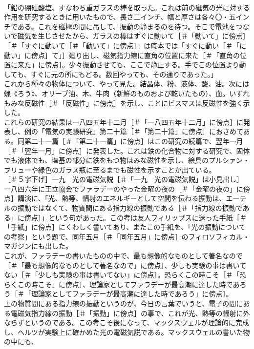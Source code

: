\documentclass[8pt]{extreport}
\begin{document}
\begin{CJK}{UTF8}{min}
\\	「鉛の硼硅酸塩、すなわち重ガラスの棒を取った。これは前の磁気の光に対する作用を研究するときに用いたもので、長さ二インチ、幅と厚さは各々〇・五インチである。これを磁極の間に吊して、振動の静まるのを待つ。そこで電池をつないで磁気を生じさせたから、ガラスの棒はすぐに動いて［＃「動いて」に傍点］［＃「すぐに動いて［＃「動いて」に傍点］」は底本では「すぐに動い［＃「に動い」に傍点］て」］廻り出し、磁気指力線に直角の位置に来た［＃「直角の位置に来た」に傍点］。少々振動させても、ここで静止する。手でこの位置より動しても、すぐに元の所にもどる。数回やっても、その通りであった。」
\\	これから種々の物体について、やって見た。結晶体、粉、液体、酸、油。次には蝋《ろう》、オリーブ油、木、牛肉（新鮮のものおよび乾いたもの）、血。いずれもみな反磁性［＃「反磁性」に傍点］を示し、ことにビスマスは反磁性を強く示した。
\\	これらの研究の結果は一八四五年十二月［＃「一八四五年十二月」に傍点］に発表し、例の「電気の実験研究」第二十篇［＃「第二十篇」に傍点］におさめてある。同第二十一篇［＃「第二十一篇」に傍点］はこの研究の続篇で、翌年一月［＃「翌年一月」に傍点］に発表した。これは鉄の化合物に対する研究で、固体でも液体でも、塩基の部分に鉄をもつ物はみな磁性を示し、絵具のプルシァン・ブリューや緑色のガラス瓶に至るまでも磁性を示すことが出ている。
\\	［＃５字下げ］一九　光の電磁気説［＃「一九　光の電磁気説」は小見出し］
\\	一八四六年に王立協会でファラデーのやった金曜の夜の［＃「金曜の夜の」に傍点］講演に、「光、熱等、輻射のエネルギーとして空間を伝わる振動は、エーテルの振動ではなくて、物質間にある指力線の振動である［＃「指力線の振動である」に傍点］」という句があった。この考は友人フィリップスに送った手紙［＃「手紙」に傍点］にくわしく書いてあり、またこの手紙を、「光の振動についての考察」という題で、同年五月［＃「同年五月」に傍点］のフィロソフィカル・マガジンにも出した。
\\	これが、ファラデーの書いたものの中で、最も想像的なものとして著名なので［＃「最も想像的なものとして著名なので」に傍点］、少しも実験の事は書いてない［＃「少しも実験の事は書いてない」に傍点］。恐らくこの時こそ［＃「恐らくこの時こそ」に傍点］、理論家としてファラデーが最高潮に達した時であろう［＃「理論家としてファラデーが最高潮に達した時であろう」に傍点］。
\\	上の物質間にある指力線の振動というのが、今日の言葉でいうと、電子の間にある電磁気指力線の振動［＃「振動」に傍点］の事で、これが光、熱等の輻射に外ならずというのである。この考こそ後になって、マックスウェルが理論的に完成し、ヘルツが実験上に確かめた光の電磁気説である。マックスウェルの書いた物の中にも、

\end{CJK}
\end{document}
